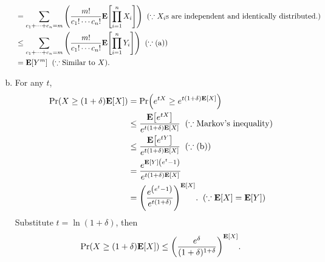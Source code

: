 \documentclass{article}
\begin{document}
\begin{enumerate}[(a)]
\begin{align*}
        &= \sum_{c_1 + \cdots + c_n = m}\qty(\frac{m!}{c_1! \cdots c_n!}\mathbf{E}\qty[\prod_{i=1}^{n}X_i]) \;\;\qty(\because X_i\text{s are independent and identically distributed.}) \\
        &\leq \sum_{c_1 + \cdots + c_n = m}\qty(\frac{m!}{c_1! \cdots c_n!}\mathbf{E}\qty[\prod_{i=1}^{n}Y_i]) \;\; \qty(\because \text{(a)}) \\
        &= \mathbf{E}\qty[Y^m] \;\; \qty(\because \text{Similar to }X).
    \end{align*}
    \item For any $t$, 
    \begin{align*}
        \mathrm{Pr}\qty(X \geq (1+\delta)\mathbf{E}\qty[X]) &= \mathrm{Pr}\qty(e^{tX} \geq e^{t(1+\delta)\mathbf{E}\qty[X]}) \\
        &\leq \frac{\mathbf{E}\qty[e^{tX}]}{e^{t(1+\delta)\mathbf{E}\qty[X]}} \;\; \qty(\because \text{Markov's inequality}) \\
        &\leq \frac{\mathbf{E}\qty[e^{tY}]}{e^{t(1+\delta)\mathbf{E}\qty[X]}} \;\; \qty(\because \text{(b)}) \\
        &= \frac{e^{\mathbf{E}\qty[Y]\qty(e^t-1)}}{e^{t(1+\delta)\mathbf{E}\qty[X]}} \\
        &= \qty(\frac{e^{\qty(e^t-1)}}{e^{t(1+\delta)}})^{\mathbf{E}\qty[X]}. \;\; \qty(\because \mathbf{E}\qty[X] = \mathbf{E}\qty[Y]) \\
    \end{align*}
    Substitute $t = \ln(1+\delta)$, then
    $$\mathrm{Pr}\qty(X \geq (1+\delta)\mathbf{E}\qty[X]) \leq \qty(\frac{e^\delta}{(1+\delta)^{1+\delta}})^{\mathbf{E}\qty[X]}.$$
\end{enumerate}
\end{document}
